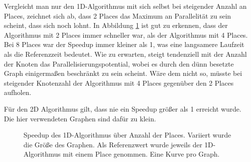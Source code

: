 Vergleicht man nur den 1D-Algorithmus mit sich selbst bei steigender Anzahl an Places, zeichnet sich ab, dass 2 Places das Maximum an Parallelität zu sein scheint, dass sich noch lohnt. In Abbildung \ref{fig:groesse_speedup} ist gut zu erkennen, dass der Algorithmus mit 2 Places immer schneller war, als der Algorithmus mit 4 Places. Bei 8 Places war der Speedup immer kleiner als 1, was eine langsamere Laufzeit als die Referenzzeit bedeutet. Wie zu erwarten, steigt tendenziell mit der Anzahl der Knoten das Parallelisierungspotential, wobei es durch den dünn besetzte Graph einigermaßen beschränkt zu sein scheint. Wäre dem nicht so, müsste bei steigender Knotenzahl der Algorithmus mit 4 Places gegenüber den 2 Places aufholen.

Für den 2D Algorithmus gilt, dass nie ein Speedup größer als 1 erreicht wurde. Die hier verwendeten Graphen sind dafür zu klein.

\begin{figure}
	\centering
	\caption{Speedup des 1D-Algorithmus über Anzahl der Places. Variiert wurde die Größe des Graphen. Als Referenzwert wurde jeweils der 1D-Algorithmus mit einem Place genommen. Eine Kurve pro Graph.}
	\label{fig:groesse_speedup}
\end{figure}

